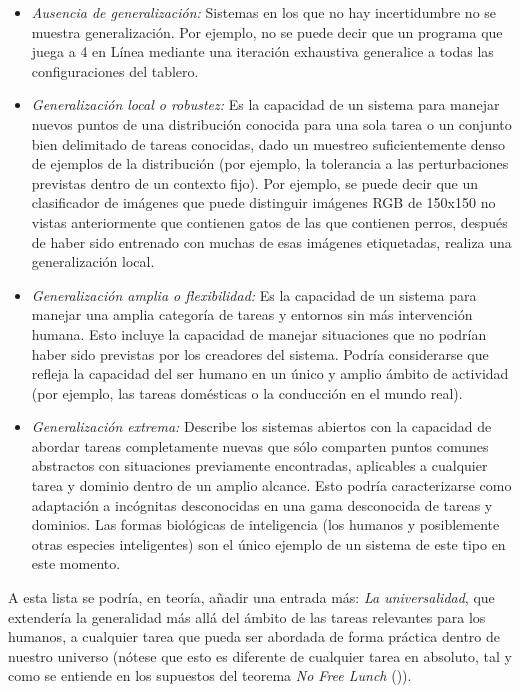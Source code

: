 \begin{itemize}
\item \textit{Ausencia de generalización:} Sistemas en los que no hay incertidumbre no se muestra generalización. Por ejemplo, no se puede decir que un programa que juega a 4 en Línea mediante una iteración exhaustiva generalice a todas las configuraciones del tablero.

\item \textit{Generalización local o robustez:} Es la capacidad de un sistema para manejar nuevos puntos de una distribución conocida para una sola tarea o un conjunto bien delimitado de tareas conocidas, dado un muestreo suficientemente denso de ejemplos de la distribución (por ejemplo, la tolerancia a las perturbaciones previstas dentro de un contexto fijo). Por ejemplo, se puede decir que un clasificador de imágenes que puede distinguir imágenes RGB de 150x150 no vistas anteriormente que contienen gatos de las que contienen perros, después de haber sido entrenado con muchas de esas imágenes etiquetadas, realiza una generalización local. 

\item \textit{Generalización amplia o flexibilidad:} Es la capacidad de un sistema para manejar una amplia categoría de tareas y entornos sin más intervención humana. Esto incluye la capacidad de manejar situaciones que no podrían haber sido previstas por los creadores del sistema. Podría considerarse que refleja la capacidad del ser humano en un único y amplio ámbito de actividad (por ejemplo, las tareas domésticas o la conducción en el mundo real).

\item \textit{Generalización extrema:} Describe los sistemas abiertos con la capacidad de abordar tareas completamente nuevas que sólo comparten puntos comunes abstractos con situaciones previamente encontradas, aplicables a cualquier tarea y dominio dentro de un amplio alcance. Esto podría caracterizarse como adaptación a incógnitas desconocidas en una gama desconocida de tareas y dominios. Las formas biológicas de inteligencia (los humanos y posiblemente otras especies inteligentes) son el único ejemplo de un sistema de este tipo en este momento.
\end{itemize}

A esta lista se podría, en teoría, añadir una entrada más: \textit{La universalidad}, que extendería la generalidad más allá del ámbito de las tareas relevantes para los humanos, a cualquier tarea que pueda ser abordada de forma práctica dentro de nuestro universo (nótese que esto es diferente de cualquier tarea en absoluto, tal y como se entiende en los supuestos del teorema \textit{No Free Lunch} (\cite{wolpert1997no})).

